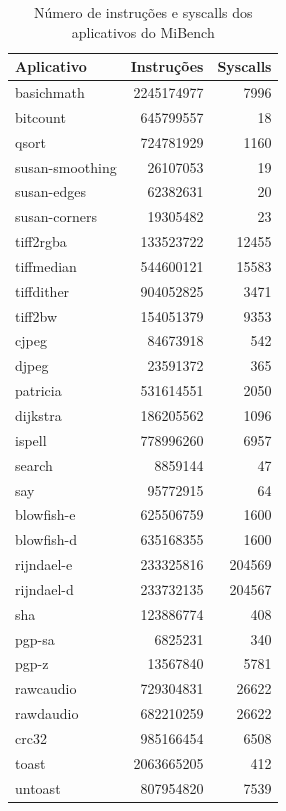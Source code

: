 \documentclass[11pt,twoside]{article}
\begin{document}
\begin{table}                                                                                                                                                                                              
 \caption{Número de instruções e syscalls dos aplicativos do MiBench}
 \begin{center}
  \begin{tabular}{|l|r|r|} \hline
    \bf{Aplicativo} & \bf{Instruções} & \bf{Syscalls} \\ \hline                                                                                                                                            
    basichmath & 2245174977 & 7996 \\ \hline
    bitcount & 645799557 & 18 \\ \hline
    qsort & 724781929 & 1160 \\ \hline
    susan-smoothing & 26107053 & 19 \\ \hline
    susan-edges & 62382631 & 20 \\ \hline
    susan-corners & 19305482 & 23 \\ \hline
    tiff2rgba & 133523722 & 12455 \\ \hline
    tiffmedian & 544600121 & 15583 \\ \hline
    tiffdither & 904052825 & 3471 \\ \hline
    tiff2bw & 154051379 & 9353 \\ \hline
    cjpeg & 84673918 & 542 \\ \hline
    djpeg & 23591372 & 365 \\ \hline
    patricia & 531614551 & 2050 \\ \hline
    dijkstra & 186205562 & 1096 \\ \hline
    ispell & 778996260 & 6957 \\ \hline
    search & 8859144 & 47 \\ \hline
    say & 95772915 & 64 \\ \hline
    blowfish-e & 625506759 & 1600 \\ \hline
    blowfish-d & 635168355 & 1600 \\ \hline
    rijndael-e & 233325816 & 204569 \\ \hline
    rijndael-d & 233732135 & 204567 \\ \hline
    sha & 123886774 & 408 \\ \hline
    pgp-sa & 6825231 & 340 \\ \hline
    pgp-z & 13567840 & 5781 \\ \hline
    rawcaudio & 729304831 & 26622 \\ \hline
    rawdaudio & 682210259 & 26622 \\ \hline
    crc32 & 985166454 & 6508 \\ \hline
    toast & 2063665205 & 412 \\ \hline
    untoast & 807954820 & 7539 \\ \hline
  \end{tabular}
  \label{tab:mibench}
 \end{center}
\end{table}
\end{document}

